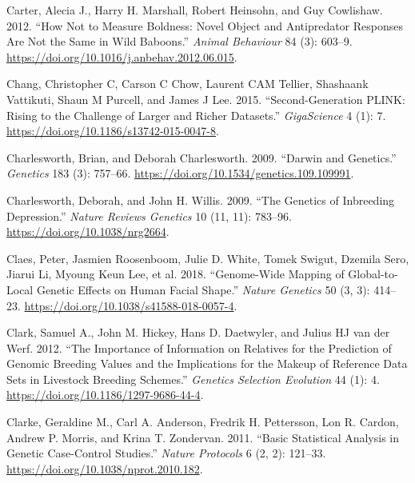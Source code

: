 \documentclass[
]{book}
\newlength{\cslhangindent}
\newlength{\cslentryspacingunit} %
\newenvironment{CSLReferences}[2] %
 {%
  \setlength{\parindent}{0pt}
  \ifodd #1
  \let\oldpar\par
  \def\par{\hangindent=\cslhangindent\oldpar}
  \fi
  \setlength{\parskip}{#2\cslentryspacingunit}
 }%
 {}
\begin{document}
\begin{CSLReferences}{1}{0}
\leavevmode{}%
Carter, Alecia J., Harry H. Marshall, Robert Heinsohn, and Guy Cowlishaw. 2012. {``How Not to Measure Boldness: Novel Object and Antipredator Responses Are Not the Same in Wild Baboons.''} \emph{Animal Behaviour} 84 (3): 603--9. \url{https://doi.org/10.1016/j.anbehav.2012.06.015}.

\leavevmode{}%
Chang, Christopher C, Carson C Chow, Laurent CAM Tellier, Shashaank Vattikuti, Shaun M Purcell, and James J Lee. 2015. {``Second-Generation {PLINK}: Rising to the Challenge of Larger and Richer Datasets.''} \emph{GigaScience} 4 (1): 7. \url{https://doi.org/10.1186/s13742-015-0047-8}.

\leavevmode{}%
Charlesworth, Brian, and Deborah Charlesworth. 2009. {``Darwin and {Genetics}.''} \emph{Genetics} 183 (3): 757--66. \url{https://doi.org/10.1534/genetics.109.109991}.

\leavevmode{}%
Charlesworth, Deborah, and John H. Willis. 2009. {``The Genetics of Inbreeding Depression.''} \emph{Nature Reviews Genetics} 10 (11, 11): 783--96. \url{https://doi.org/10.1038/nrg2664}.

\leavevmode{}%
Claes, Peter, Jasmien Roosenboom, Julie D. White, Tomek Swigut, Dzemila Sero, Jiarui Li, Myoung Keun Lee, et al. 2018. {``Genome-Wide Mapping of Global-to-Local Genetic Effects on Human Facial Shape.''} \emph{Nature Genetics} 50 (3, 3): 414--23. \url{https://doi.org/10.1038/s41588-018-0057-4}.

\leavevmode{}%
Clark, Samuel A., John M. Hickey, Hans D. Daetwyler, and Julius HJ van der Werf. 2012. {``The Importance of Information on Relatives for the Prediction of Genomic Breeding Values and the Implications for the Makeup of Reference Data Sets in Livestock Breeding Schemes.''} \emph{Genetics Selection Evolution} 44 (1): 4. \url{https://doi.org/10.1186/1297-9686-44-4}.

\leavevmode{}%
Clarke, Geraldine M., Carl A. Anderson, Fredrik H. Pettersson, Lon R. Cardon, Andrew P. Morris, and Krina T. Zondervan. 2011. {``Basic Statistical Analysis in Genetic Case-Control Studies.''} \emph{Nature Protocols} 6 (2, 2): 121--33. \url{https://doi.org/10.1038/nprot.2010.182}.


\end{CSLReferences}
\end{document}
